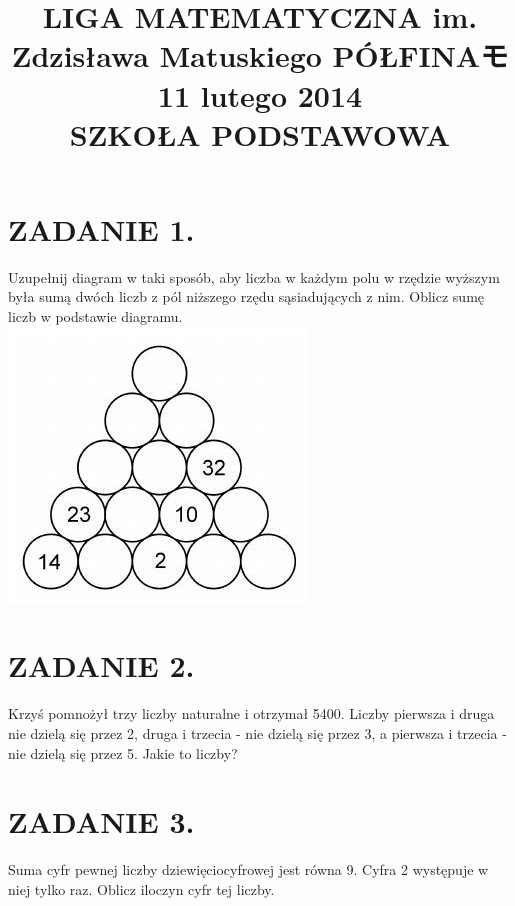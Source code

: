 \documentclass[10pt]{article}
\title{LIGA MATEMATYCZNA im. Zdzisława Matuskiego PÓŁFINAモ \\
 11 lutego 2014 \\
 SZKOŁA PODSTAWOWA }
\author{}
\date{}
\begin{document}
\maketitle
\section*{ZADANIE 1.}
Uzupełnij diagram w taki sposób, aby liczba w każdym polu w rzędzie wyższym była sumą dwóch liczb z pól niższego rzędu sąsiadujących z nim. Oblicz sumę liczb w podstawie diagramu.\\
\includegraphics[max width=\textwidth, center]{2024_11_21_cb616dfad60f996777b8g-1}

\section*{ZADANIE 2.}
Krzyś pomnożył trzy liczby naturalne i otrzymał 5400. Liczby pierwsza i druga nie dzielą się przez 2, druga i trzecia - nie dzielą się przez 3, a pierwsza i trzecia - nie dzielą się przez 5. Jakie to liczby?

\section*{ZADANIE 3.}
Suma cyfr pewnej liczby dziewięciocyfrowej jest równa 9. Cyfra 2 występuje w niej tylko raz. Oblicz iloczyn cyfr tej liczby.
\end{document}
